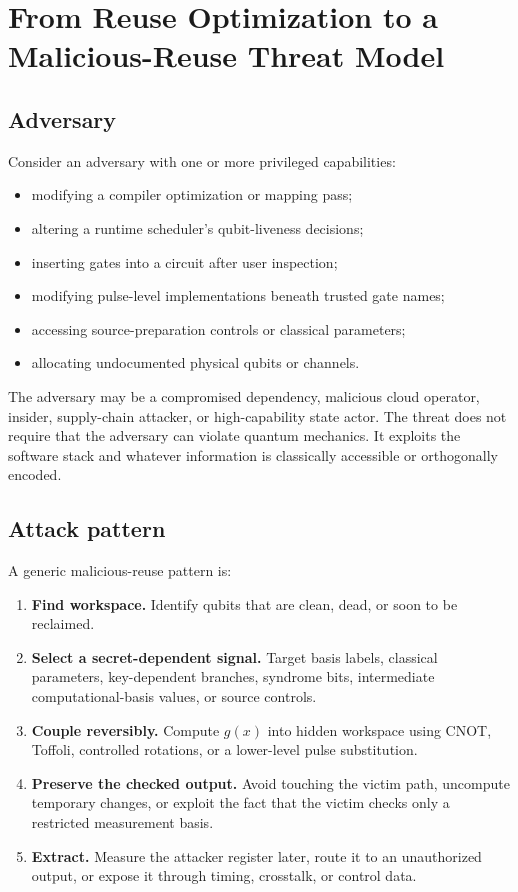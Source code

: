 \section{From Reuse Optimization to a Malicious-Reuse Threat Model}
\label{sec:threat-model}

\subsection{Adversary}

Consider an adversary with one or more privileged capabilities:

\begin{itemize}
  \item modifying a compiler optimization or mapping pass;
  \item altering a runtime scheduler's qubit-liveness decisions;
  \item inserting gates into a circuit after user inspection;
  \item modifying pulse-level implementations beneath trusted gate names;
  \item accessing source-preparation controls or classical parameters;
  \item allocating undocumented physical qubits or channels.
\end{itemize}

The adversary may be a compromised dependency, malicious cloud operator,
insider, supply-chain attacker, or high-capability state actor. The threat does
not require that the adversary can violate quantum mechanics. It exploits the
software stack and whatever information is classically accessible or
orthogonally encoded.

\subsection{Attack pattern}

A generic malicious-reuse pattern is:

\begin{enumerate}[leftmargin=1.8em]
  \item \textbf{Find workspace.} Identify qubits that are clean, dead, or soon
  to be reclaimed.
  \item \textbf{Select a secret-dependent signal.} Target basis labels,
  classical parameters, key-dependent branches, syndrome bits, intermediate
  computational-basis values, or source controls.
  \item \textbf{Couple reversibly.} Compute $g(x)$ into hidden workspace using
  CNOT, Toffoli, controlled rotations, or a lower-level pulse substitution.
  \item \textbf{Preserve the checked output.} Avoid touching the victim path,
  uncompute temporary changes, or exploit the fact that the victim checks only
  a restricted measurement basis.
  \item \textbf{Extract.} Measure the attacker register later, route it to an
  unauthorized output, or expose it through timing, crosstalk, or control data.
\end{enumerate}

